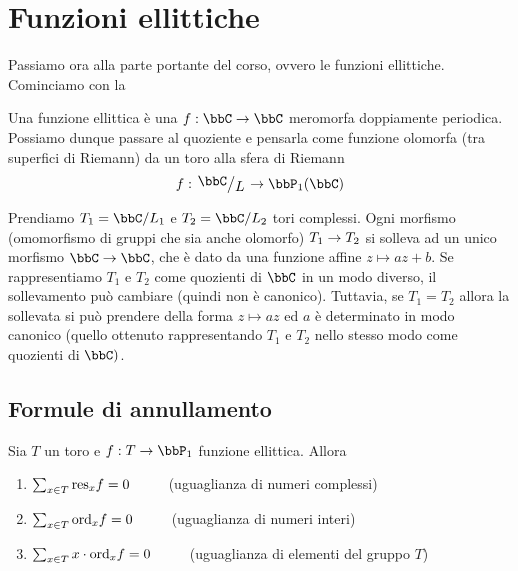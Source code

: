 \chapter{Funzioni ellittiche}

Passiamo ora alla parte portante del corso, ovvero le funzioni ellittiche. Cominciamo con la

\begin{definizione}
    Una funzione ellittica è una $f:\bbC\to\bbC$ meromorfa doppiamente periodica. Possiamo dunque passare al quoziente e pensarla come funzione olomorfa (tra superfici di Riemann) da un toro alla sfera di Riemann $$ f: \quotient{\bbC}{L}\to \bbP_1(\bbC)$$
\end{definizione}

Prendiamo $T_1=\bbC/L_1$ e $T_2=\bbC/L_2$ tori complessi.
Ogni morfismo (omomorfismo di gruppi che sia anche olomorfo) $T_1\rightarrow T_2$ si solleva ad un unico morfismo $\bbC\rar\bbC$, che è dato da una funzione affine $z \mapsto az + b$.
Se rappresentiamo $T_1$ e $T_2$ come quozienti di $\bbC$ in un modo diverso, il sollevamento può cambiare (quindi non è canonico).
Tuttavia, se $T_1=T_2$ allora la sollevata si può prendere della forma $z \mapsto az$ ed $a$ è determinato in modo canonico (quello ottenuto rappresentando $T_1$ e $T_2$ nello stesso modo come quozienti di $\bbC)$.

\section{Formule di annullamento}

\begin{teorema}
  \label{residui-funzioni-toriche}
  Sia $T$ un toro e $f:T\rar\bbP_1$ funzione ellittica. Allora
\begin{enumerate}
    \item $\sum_{x\in T}\text{res}_xf=0$ $\qquad$ (uguaglianza di numeri complessi)

    \item $\sum_{x\in T}\text{ord}_xf=0$ $\qquad$ (uguaglianza di numeri interi)

    \item $\sum_{x\in T}x\cdot\text{ord}_xf=0$ $\qquad$ (uguaglianza di elementi del gruppo $T$)
\end{enumerate}

\end{teorema}



